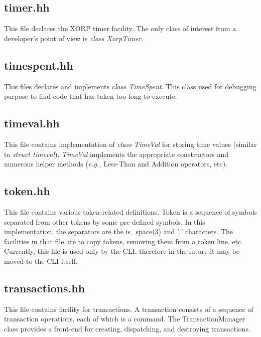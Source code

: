 \documentclass[11pt]{article}
\newcommand{\eg}{\emph{e.g.,}\xspace}
\begin{document}
\subsection{timer.hh}

This file declares the XORP timer facility. The only class of interest
from a developer's point of view is \emph{class XorpTimer}.

\subsection{timespent.hh}

This files declares and implements \emph{class TimeSpent}.
This class used for debugging purpose to find code that has taken too long to
execute.

\subsection{timeval.hh}

This file contains implementation of \emph{class TimeVal} for
storing time values (similar to \emph{struct timeval}).
\emph{TimeVal} implements the appropriate constructors and numerous
helper methods (\eg Less-Than and Addition operators, etc).

\subsection{token.hh}

This file contains various token-related definitions. Token is a
sequence of symbols separated from other tokens by some pre-defined
symbols. In this implementation, the separators are the is\_space(3) and
'|' characters.
The facilities in that file are to copy tokens, removing them from a
token line, etc.
Currently, this file is used only by the CLI, therefore in the future it
may be moved to the CLI itself.

\subsection{transactions.hh}

This file contains facility for transactions.  A transaction consists
of a sequence of transaction operations, each of which is a command.
The TransactionManager class provides a front-end for creating,
dispatching, and destroying transactions.
\end{document}
